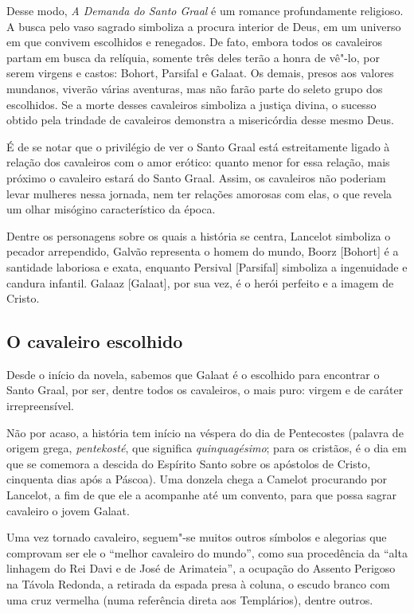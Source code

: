 \documentclass[11pt]{extarticle}
\begin{document}
Desse modo, \emph{A Demanda do Santo Graal} é
um romance profundamente religioso. A busca pelo vaso sagrado simboliza
a procura interior de Deus, em um universo em que convivem escolhidos e
renegados. De fato, embora todos os cavaleiros partam em busca da
relíquia, somente três deles terão a honra de vê"-lo, por serem virgens e
castos: Bohort, Parsifal e Galaat. Os demais, presos aos valores
mundanos, viverão várias aventuras, mas não farão parte do seleto grupo
dos escolhidos. Se a morte desses cavaleiros simboliza a justiça divina,
o sucesso obtido pela trindade de cavaleiros demonstra a misericórdia
desse mesmo Deus.


É de se notar que o privilégio de ver o Santo Graal está
estreitamente ligado à relação dos cavaleiros com o amor erótico: quanto
menor for essa relação, mais próximo o cavaleiro estará do Santo Graal.
Assim, os cavaleiros não poderiam levar mulheres nessa jornada, nem ter
relações amorosas com elas, o que revela um olhar misógino
característico da época.

Dentre os personagens sobre os quais a história se centra,
Lancelot simboliza o pecador arrependido, Galvão representa o homem do
mundo, Boorz {[}Bohort{]} é a santidade laboriosa e exata, enquanto
Persival {[}Parsifal{]} simboliza a ingenuidade e candura infantil.
Galaaz {[}Galaat{]}, por sua vez, é o herói perfeito e a imagem de
Cristo.

\subsection{O cavaleiro escolhido}

Desde o início da novela, sabemos que Galaat é o escolhido para
encontrar o Santo Graal, por ser, dentre todos os cavaleiros, o mais
puro: virgem e de caráter
irrepreensível.

Não por acaso, a história tem início na véspera
do dia de Pentecostes (palavra de origem grega, \emph{pentekosté}, que
significa \emph{quinquagésimo}; para os cristãos, é o dia em que se
comemora a descida do Espírito Santo sobre os apóstolos de Cristo,
cinquenta dias após a Páscoa). Uma donzela chega a Camelot procurando
por Lancelot, a fim de que ele a acompanhe até um convento, para que
possa sagrar cavaleiro o jovem
Galaat.

Uma vez tornado cavaleiro, seguem"-se muitos outros símbolos e
alegorias que comprovam ser ele o ``melhor cavaleiro do mundo'', como
sua procedência da ``alta linhagem do Rei Davi e de José de Arimateia'',
a ocupação do Assento Perigoso na Távola Redonda, a retirada da espada
presa à coluna, o escudo branco com uma cruz vermelha (numa referência
direta aos Templários), dentre outros.
\end{document}
